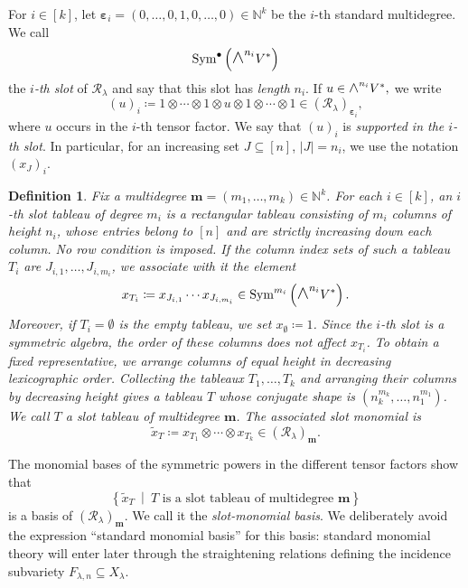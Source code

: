 \documentclass[a4paper,reqno]{amsart}
\theoremstyle{plainnopunct}
\theoremstyle{definitionnopunct}
\newtheorem{definition}[definition]{Definition}
\newcommand{\superwedge}{\mathlarger{\mathlarger{\wedge}}}
\newcommand{\N}{\mathbb{N}}
\newcommand{\cR}{\mathcal{R}}
\newcommand{\Sym}{\operatorname{Sym}}
\newcommand{\bepsilon}{\boldsymbol{\varepsilon}}
\begin{document}
For $i\in[k]$, let
$\bepsilon_i
=
(0,\ldots,0,1,0,\ldots,0)
\in\N^k$
be the $i$-th standard multidegree. We call
\[
\Sym^\bullet
\left(
\superwedge^{n_i}V^*
\right)
\]
the \emph{$i$-th slot} of $\cR_\lambda$ and say that this slot has
\emph{length} $n_i$. If
$u\in\superwedge^{n_i}V^*,$
we write
\[
(u)_i
\coloneq
1\otimes\cdots\otimes1
\otimes u
\otimes1\otimes\cdots\otimes1
\in
(\cR_\lambda)_{\bepsilon_i},
\]
where $u$ occurs in the $i$-th tensor factor. We say that $(u)_i$ is
\emph{supported in the $i$-th slot}. In particular, for an increasing
set
$J\subseteq[n]$,
$|J|=n_i$,
we use the notation $(x_J)_i$.


\begin{definition}
\label{def: slot tableaux}
Fix a multidegree
$\mathbf m=(m_1,\ldots,m_k)\in\N^k$.
For each $i\in[k]$, an \emph{$i$-th slot tableau of degree $m_i$}
is a rectangular tableau consisting of $m_i$ columns of height $n_i$,
whose entries belong to $[n]$ and are strictly increasing down each
column. No row condition is imposed. If the column index sets of such a tableau $T_i$ are
$J_{i,1},\ldots,J_{i,m_i}$,
we associate with it the element
\[
x_{T_i}
\coloneq
x_{J_{i,1}}\cdots x_{J_{i,m_i}}
\in
\Sym^{m_i}
\left(
\superwedge^{n_i}V^*
\right).
\]
Moreover, if $T_i=\emptyset$ is the empty tableau, we set $x_\emptyset \coloneqq 1$. Since the $i$-th slot is a symmetric algebra, the order of these
columns does not affect $x_{T_i}$. To obtain a fixed representative,
we arrange columns of equal height in decreasing lexicographic order. Collecting the tableaux $T_1,\ldots,T_k$
and arranging their columns by decreasing height gives a tableau $T$
whose conjugate shape is
$(n_k^{m_k},\ldots,n_1^{m_1})$.
We call $T$ a \emph{slot tableau of multidegree $\mathbf m$}. The
associated \emph{slot monomial} is
\[
\widetilde{x}_T
\coloneq
x_{T_1}\otimes\cdots\otimes x_{T_k}
\in
(\cR_\lambda)_{\mathbf m}.
\]
\end{definition}

The monomial bases of the symmetric powers in the different tensor
factors show that
\[
\left\{
\widetilde{x}_T
\ \middle|\
T
\text{ is a slot tableau of multidegree }\mathbf m
\right\}
\]
is a basis of $(\cR_\lambda)_{\mathbf m}$. We call it the
\emph{slot-monomial basis}. We deliberately avoid the expression ``standard monomial basis'' for
this basis: standard monomial theory will enter later through the
straightening relations defining the incidence subvariety
$F_{\lambda,n}\subseteq X_\lambda$.
\end{document}
